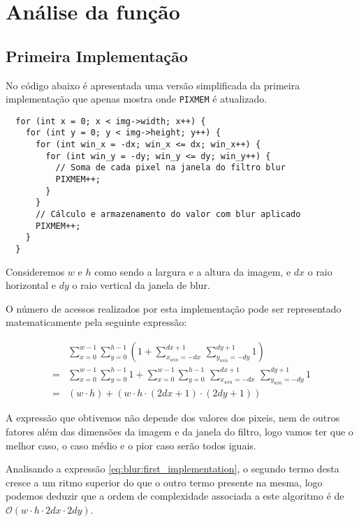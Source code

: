 \chapter{Análise da função }

\section{Primeira Implementação}

No código abaixo é apresentada uma versão simplificada da primeira implementação
que apenas mostra onde \Verb|PIXMEM| é atualizado.

\begin{listing}[H]
	\centering
	\begin{verbatim}
  for (int x = 0; x < img->width; x++) {
    for (int y = 0; y < img->height; y++) {
      for (int win_x = -dx; win_x <= dx; win_x++) {
        for (int win_y = -dy; win_y <= dy; win_y++) {
          // Soma de cada pixel na janela do filtro blur
          PIXMEM++;
        }
      }
      // Cálculo e armazenamento do valor com blur aplicado
      PIXMEM++;
    }
  }
  \end{verbatim}
\end{listing}

Consideremos $w$ e $h$ como sendo a largura e a altura da imagem, e $dx$
o raio horizontal e $dy$ o raio vertical da janela de blur.

O número de acessos realizados por esta implementação pode ser representado
matematicamente pela seguinte expressão:

\begin{align}
	  & \sum_{x = 0}^{w - 1} \sum_{y = 0}^{h - 1} \left(
	1 +
	\sum_{x_{win} = -dx}^{dx+1} \,
	\sum_{y_{win} = -dy}^{dy+1} 1
	\right)                                                          \\
	= & \sum_{x = 0}^{w - 1} \sum_{y = 0}^{h - 1} 1 +
	\sum_{x = 0}^{w - 1} \sum_{y = 0}^{h - 1} \,
	\sum_{x_{win} = -dx}^{dx + 1} \, \sum_{y_{win} = -dy}^{dy + 1} 1 \\
	= & (w \cdot h) + (w \cdot h \cdot (2dx + 1) \cdot (2dy + 1))
	\label{eq:blur:first_implementation}
\end{align}

A expressão que obtivemos não depende dos valores dos pixeis, nem de outros
fatores além das dimensões da imagem e da janela do filtro, logo vamos ter que o
melhor caso, o caso médio e o pior caso serão todos iguais.

Analisando a expressão \eqref{eq:blur:first_implementation}, o segundo termo
desta cresce a um ritmo superior do que o outro termo presente na mesma, logo
podemos deduzir que a ordem de complexidade associada a este algoritmo é de
$\mathcal{O}(w \cdot h \cdot 2dx \cdot 2dy)$.


